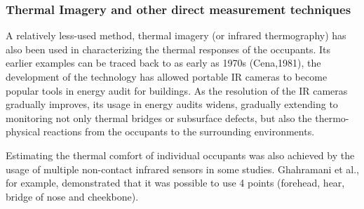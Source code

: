 \subsubsection{Thermal Imagery and other direct measurement techniques}
	A relatively less-used method, thermal imagery (or infrared thermography) has also been used in characterizing the thermal responses of the occupants. Its earlier examples can be traced back to as early as 1970s (Cena,1981), the development of the technology has allowed portable IR cameras to become popular tools in energy audit for buildings\cite{lucchi_applications_2018}. As the resolution of the IR cameras gradually improves, its usage in energy audits widens, gradually extending to monitoring not only thermal bridges or subsurface defects, but also the thermo-physical reactions from the occupants to the surrounding environments. %

	Estimating the thermal comfort of individual occupants was also achieved by the usage of multiple non-contact infrared sensors in some studies. Ghahramani et al., for example, demonstrated that it was possible to use 4 points (forehead, hear, bridge of nose and cheekbone)\cite{ghahramani_infrared_2016}. 
            
            
  